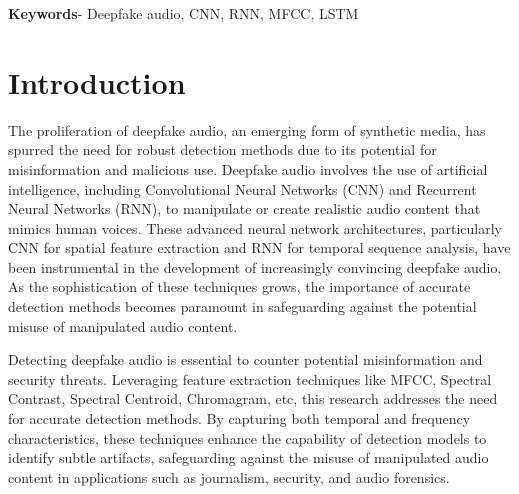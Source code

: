 \documentclass[conference]{IEEEtran}
\begin{document}
\begin{abstract}
As synthetic media techniques advance, the detection of manipulated audio content, known as deepfake audio, has become increasingly important. With the rise of challenges in cybersecurity and misinformation detection posed by deepfake audio, there is a pressing need for detection methods. This research introduces a system for recognizing deepfake audio that combines recurrent and convolutional networks and utilizes Mel Frequency Cepstral Coefficients (MFCC) for extracting features. It also explores feature extraction methods such as spectral contrast, spectral flatness and chromagram. This blended approach merges the effectiveness of MFCC in representing characteristics with CNNs expertise in capturing features and LSTMs capability in capturing temporal dependencies. The system achieves an accuracy rate of 94.73\% on a combination of two datasets named 'Wave Fake' and Release in the Wild'. By offering an adaptable solution for detecting manipulated audio content this study pushes forward the field of deepfake detection and helps tackle the challenges presented by synthetic media in audio forensics.
\end{abstract}


\begin{Keywords}
\textbf{Keywords}- Deepfake audio, CNN, RNN, MFCC, LSTM
\end{Keywords}

\section{Introduction}
The proliferation of deepfake audio, an emerging form of synthetic media, has spurred the need for robust detection methods due to its potential for misinformation and malicious use. Deepfake audio involves the use of artificial intelligence, including Convolutional Neural Networks (CNN) and Recurrent Neural Networks (RNN), to manipulate or create realistic audio content that mimics human voices. These advanced neural network architectures, particularly CNN for spatial feature extraction and RNN for temporal sequence analysis, have been instrumental in the development of increasingly convincing deepfake audio. As the sophistication of these techniques grows, the importance of accurate detection methods becomes paramount in safeguarding against the potential misuse of manipulated audio content. 


Detecting deepfake audio is essential to counter potential misinformation and security threats. Leveraging feature extraction techniques like MFCC, Spectral Contrast, Spectral Centroid, Chromagram, etc, this research addresses the need for accurate detection methods. By capturing both temporal and frequency characteristics, these techniques enhance the capability of detection models to identify subtle artifacts, safeguarding against the misuse of manipulated audio content in applications such as journalism, security, and audio forensics.
\end{document}
